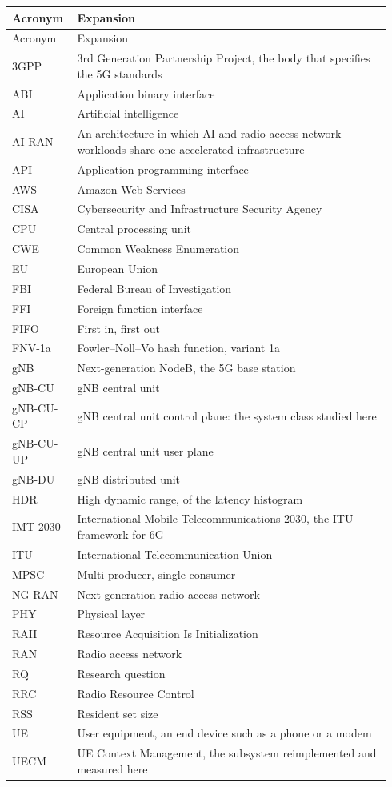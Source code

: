 \documentclass[english,twoside,openright,a4paper,censored,csm,software-track-2020]{HYthesisML}
\begin{document}
\begingroup
\singlespacing
\footnotesize
\renewcommand{\arraystretch}{1.15}
\begin{longtable}{@{}p{0.15\linewidth} p{0.79\linewidth}@{}}
\hline\hline
Acronym & Expansion \\
\hline
\endfirsthead
\hline\hline
Acronym & Expansion \\
\hline
\endhead
3GPP & 3rd Generation Partnership Project, the body that specifies the 5G standards \\
ABI & Application binary interface \\
AI & Artificial intelligence \\
AI-RAN & An architecture in which AI and radio access network workloads share one accelerated infrastructure \\
API & Application programming interface \\
AWS & Amazon Web Services \\
CISA & Cybersecurity and Infrastructure Security Agency \\
CPU & Central processing unit \\
CWE & Common Weakness Enumeration \\
EU & European Union \\
FBI & Federal Bureau of Investigation \\
FFI & Foreign function interface \\
FIFO & First in, first out \\
FNV-1a & Fowler--Noll--Vo hash function, variant 1a \\
gNB & Next-generation NodeB, the 5G base station \\
gNB-CU & gNB central unit \\
gNB-CU-CP & gNB central unit control plane: the system class studied here \\
gNB-CU-UP & gNB central unit user plane \\
gNB-DU & gNB distributed unit \\
HDR & High dynamic range, of the latency histogram \\
IMT-2030 & International Mobile Telecommunications-2030, the ITU framework for 6G \\
ITU & International Telecommunication Union \\
MPSC & Multi-producer, single-consumer \\
NG-RAN & Next-generation radio access network \\
PHY & Physical layer \\
RAII & Resource Acquisition Is Initialization \\
RAN & Radio access network \\
RQ & Research question \\
RRC & Radio Resource Control \\
RSS & Resident set size \\
UE & User equipment, an end device such as a phone or a modem \\
UECM & UE Context Management, the subsystem reimplemented and measured here \\
\hline
\end{longtable}
\endgroup
\end{document}
